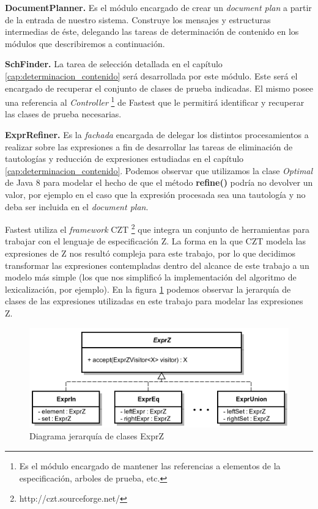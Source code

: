\bigskip
\noindent
\textbf{DocumentPlanner.} Es el módulo encargado de crear un \textit{document plan} a partir de la entrada de nuestro sistema. Construye los mensajes y estructuras intermedias de éste, delegando las tareas de determinación de contenido en los módulos que describiremos a continuación.

\bigskip
\noindent
\textbf{SchFinder.} La tarea de selección detallada en el capítulo \ref{cap:determinacion_contenido} será desarrollada por este módulo. Este será el encargado de recuperar el conjunto de clases de prueba indicadas. El mismo posee una referencia al \emph{Controller} \footnote{Es el módulo encargado de mantener las referencias a elementos de la especificación, arboles de prueba, etc.} de Fastest que le permitirá identificar y recuperar las clases de prueba necesarias. 


\bigskip
\noindent
\textbf{ExprRefiner.} Es la \textit{fachada} \cite{gof} encargada de delegar los distintos procesamientos a realizar sobre las expresiones a fin de desarrollar las tareas de eliminación de tautologías y reducción de expresiones estudiadas en el capítulo \ref{cap:determinacion_contenido}. Podemos observar que utilizamos la clase \emph{Optimal} de Java 8 para modelar el hecho de que el método \textbf{refine()} podría no devolver un valor, por ejemplo en el caso que la expresión procesada sea una tautología y no deba ser incluida en el \textit{document plan}.

\bigskip
Fastest utiliza el \textit{framework} CZT \footnote{http://czt.sourceforge.net/} que integra un conjunto de herramientas para trabajar con el lenguaje de especificación Z. La forma en la que CZT modela las expresiones de Z nos resultó compleja para este trabajo, por lo que decidimos transformar las expresiones contempladas dentro del alcance de este trabajo a un modelo más simple (los que nos simplificó la implementación del algoritmo de lexicalización, por ejemplo). En la figura \ref{fig:imp_exprz} podemos observar la jerarquía de clases de las expresiones utilizadas en este trabajo para modelar las expresiones Z. 

\begin{figure}[H]
  	\centering
	\includegraphics[scale=0.31]{img/exprz_imp.png}
	\caption{Diagrama jerarquía de clases ExprZ}
  	\label{fig:imp_exprz}
\end{figure}


